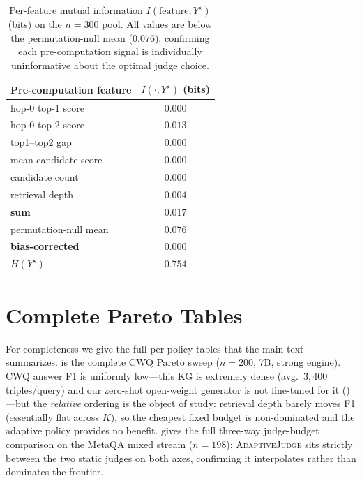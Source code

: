 \begin{table}[t]
\centering
\caption{Per-feature mutual information $I(\text{feature};Y^\star)$ (bits) on the $n{=}300$ pool. All values are below the permutation-null mean ($0.076$), confirming each pre-computation signal is individually uninformative about the optimal judge choice.}
\label{tab:mi}
\small
\begin{tabular}{@{}lc@{}}
\toprule
Pre-computation feature & $I(\cdot;Y^\star)$ (bits) \\
\midrule
hop-0 top-1 score      & $0.000$ \\
hop-0 top-2 score      & $0.013$ \\
top1--top2 gap         & $0.000$ \\
mean candidate score   & $0.000$ \\
candidate count        & $0.000$ \\
retrieval depth        & $0.004$ \\
\midrule
\textbf{sum}           & $0.017$ \\
permutation-null mean  & $0.076$ \\
\textbf{bias-corrected}& $\mathbf{0.000}$ \\
$H(Y^\star)$           & $0.754$ \\
\bottomrule
\end{tabular}
\end{table}

\section{Complete Pareto Tables}
\label{app:pareto}

For completeness we give the full per-policy tables that the main text summarizes.  is the complete CWQ Pareto sweep ($n{=}200$, 7B, strong engine). CWQ answer F1 is uniformly low---this KG is extremely dense (avg.\ $3{,}400$ triples/query) and our zero-shot open-weight generator is not fine-tuned for it ()---but the \emph{relative} ordering is the object of study: retrieval depth barely moves F1 (essentially flat across $K$), so the cheapest fixed budget is non-dominated and the adaptive policy provides no benefit.  gives the full three-way judge-budget comparison on the MetaQA mixed stream ($n{=}198$): \textsc{AdaptiveJudge} sits strictly between the two static judges on both axes, confirming it interpolates rather than dominates the frontier.

